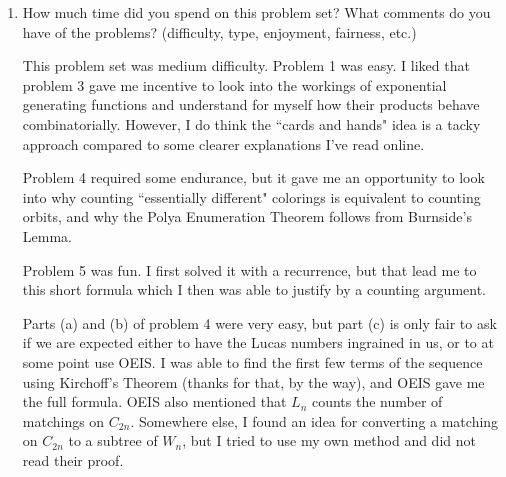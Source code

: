 \documentclass[12pt]{article}
\begin{document}
\begin{enumerate}[leftmargin=0cm,itemindent=.5cm,labelwidth=\itemindent,labelsep=0cm,align=left]
\begin{proof}
Under this relation, each equivalence class contains $2^n$ elements.  Given one ordering, the equivalent orderings are those obtained by swapping the order in which we put a sock and a shoe onto the $i$th leg.  This gives $2^n$ total binary choices, one for each leg.  Exactly one of these orderings is a ``good" ordering - the one in which the sock comes first for each leg.  Thus, the total number of good orderings is $\dfrac{(2n)!}{2^n}$.  So for a spider with 8 legs, there are $\dfrac{16!}{2^8}$.

Once we have done this part, all we need to do is permute the socks and shoes.  This gives two factors of $8!$.  So the total count is
$$
\dfrac{16!8!8!}{2^8}.
$$

\end{proof}

\item How much time did you spend on this problem set?  What comments do you have of the problems? (difficulty, type, enjoyment, fairness, etc.)

This problem set was medium difficulty.  Problem 1 was easy.  I liked that problem 3 gave me incentive to look into the workings of exponential generating functions and understand for myself how their products behave combinatorially.  However, I do think the ``cards and hands" idea is a tacky approach compared to some clearer explanations I've read online.

Problem 4 required some endurance, but it gave me an opportunity to look into why counting ``essentially different" colorings is equivalent to counting orbits, and why the Polya Enumeration Theorem follows from Burnside's Lemma.

Problem 5 was fun.  I first solved it with a recurrence, but that lead me to this short formula which I then was able to justify by a counting argument.

Parts (a) and (b) of problem 4 were very easy, but part (c) is only fair to ask if we are expected either to have the Lucas numbers ingrained in us, or to at some point use OEIS.  I was able to find the first few terms of the sequence using Kirchoff's Theorem (thanks for that, by the way), and OEIS gave me the full formula.  OEIS also mentioned that $L_n$ counts the number of matchings on $C_{2n}$.  Somewhere else, I found an idea for converting a matching on $C_{2n}$ to a subtree of $W_n$, but I tried to use my own method and did not read their proof.

\end{enumerate}
\end{document}
